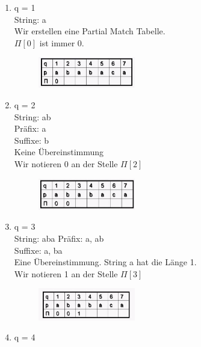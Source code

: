 \documentclass[a4paper,10pt]{report}
\begin{document}
\begin{enumerate}
\item
q = 1\\
String: a\\
Wir erstellen eine Partial Match Tabelle.\\
$\Pi[0]$ ist immer 0. 
\begin{figure}[H]
	\begin{center}
  		\includegraphics[width=0.4\textwidth]{img/kmp1.png}
	\end{center}
\end{figure}
\item
q = 2\\
String: ab\\
Präfix: a\\
Suffixe: b\\
Keine Übereinstimmung\\
Wir notieren 0 an der Stelle $\Pi[2]$
\begin{figure}[H]
	\begin{center}
  		\includegraphics[width=0.4\textwidth]{img/kmp2.png}
	\end{center}
\end{figure}
\newpage
\item
q = 3\\
String: aba
Präfix: a, ab\\
Suffixe: a, ba\\
Eine Übereinstimmung. String a hat die Länge 1.\\
Wir notieren 1 an der Stelle $\Pi[3]$
\begin{figure}[H]
	\begin{center}
  		\includegraphics[width=0.4\textwidth]{img/kmp3.png}
	\end{center}
\end{figure}
\item
q = 4\\

\end{enumerate}
\end{document}
